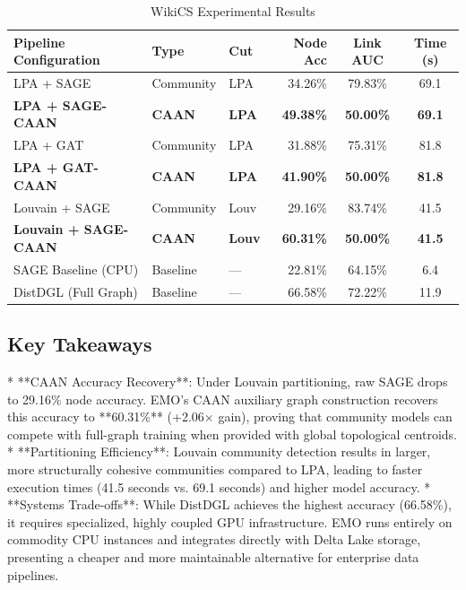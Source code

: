 \documentclass[conference,compsoc]{IEEEtran}
\begin{document}
\begin{table}[!h]
\renewcommand{\arraystretch}{1.2}
\caption{WikiCS Experimental Results}
\label{table_results}
\centering
\begin{tabular}{@{}lllrcc@{}}
\toprule
\textbf{Pipeline Configuration} & \textbf{Type} & \textbf{Cut} & \textbf{Node Acc} & \textbf{Link AUC} & \textbf{Time (s)} \\
\midrule
LPA + SAGE & Community & LPA & 34.26\% & 79.83\% & 69.1 \\
\textbf{LPA + SAGE-CAAN} & \textbf{CAAN} & \textbf{LPA} & \textbf{49.38\%} & \textbf{50.00\%} & \textbf{69.1} \\
LPA + GAT & Community & LPA & 31.88\% & 75.31\% & 81.8 \\
\textbf{LPA + GAT-CAAN} & \textbf{CAAN} & \textbf{LPA} & \textbf{41.90\%} & \textbf{50.00\%} & \textbf{81.8} \\
Louvain + SAGE & Community & Louv & 29.16\% & 83.74\% & 41.5 \\
\textbf{Louvain + SAGE-CAAN} & \textbf{CAAN} & \textbf{Louv} & \textbf{60.31\%} & \textbf{50.00\%} & \textbf{41.5} \\
SAGE Baseline (CPU) & Baseline & — & 22.81\% & 64.15\% & 6.4 \\
DistDGL (Full Graph) & Baseline & — & 66.58\% & 72.22\% & 11.9 \\
\bottomrule
\end{tabular}
\end{table}

\subsection{Key Takeaways}
* **CAAN Accuracy Recovery**: Under Louvain partitioning, raw SAGE drops to 29.16\% node accuracy. EMO's CAAN auxiliary graph construction recovers this accuracy to **60.31\%** (+2.06$\times$ gain), proving that community models can compete with full-graph training when provided with global topological centroids.
* **Partitioning Efficiency**: Louvain community detection results in larger, more structurally cohesive communities compared to LPA, leading to faster execution times (41.5 seconds vs. 69.1 seconds) and higher model accuracy.
* **Systems Trade-offs**: While DistDGL achieves the highest accuracy (66.58\%), it requires specialized, highly coupled GPU infrastructure. EMO runs entirely on commodity CPU instances and integrates directly with Delta Lake storage, presenting a cheaper and more maintainable alternative for enterprise data pipelines.
\end{document}
